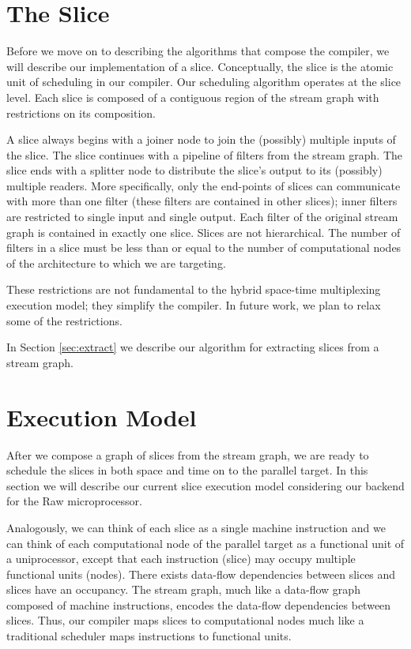 

\section{The Slice}
Before we move on to describing the algorithms that compose the
compiler, we will describe our implementation of a
slice. Conceptually, the slice is the atomic unit of scheduling in our
compiler.  Our scheduling algorithm operates at the slice level.
Each slice is composed of a contiguous region of the stream
graph with restrictions on its composition. 

A slice always begins with a joiner node to join the (possibly)
multiple inputs of the slice.  The slice continues with a pipeline of
filters from the stream graph.  The slice ends with a splitter node to
distribute the slice's output to its (possibly) multiple readers.
More specifically, only the end-points of slices can communicate with
more than one filter (these filters are contained in other slices);
inner filters are restricted to single input and single output.  Each
filter of the original stream graph is contained in exactly one slice.
Slices are not hierarchical.  The number of filters in a slice must be
less than or equal to the number of computational nodes of the
architecture to which we are targeting.

These restrictions are not fundamental to the hybrid space-time
multiplexing execution model; they simplify the compiler.  In future
work, we plan to relax some of the restrictions.

In Section \ref{sec:extract} we describe our algorithm for extracting
slices from a stream graph.

\section{Execution Model}
After we compose a graph of slices from the stream graph, we are ready
to schedule the slices in both space and time on to the parallel
target.  In this section we will describe our current slice execution
model considering our backend for the Raw microprocessor.

Analogously, we can think of each slice as a single machine
instruction and we can think of each computational node of the
parallel target as a functional unit of a uniprocessor, except that
each instruction (slice) may occupy multiple functional units
(nodes). There exists data-flow dependencies between slices and slices
have an occupancy.  The stream graph, much like a data-flow graph
composed of machine instructions, encodes the data-flow dependencies
between slices. Thus, our compiler maps slices to computational nodes
much like a traditional scheduler maps instructions to functional
units.

